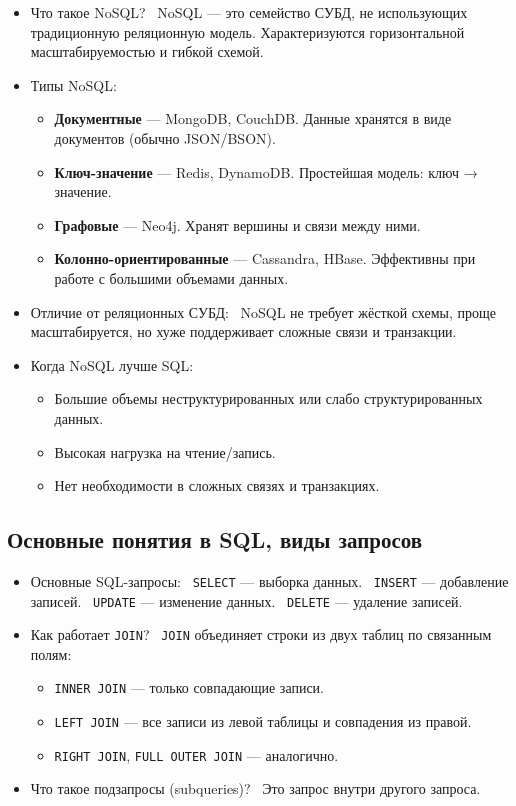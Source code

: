 \documentclass[a4paper,14pt]{article}
\begin{document}
\begin{itemize}
\item Что такое NoSQL? \
NoSQL — это семейство СУБД, не использующих традиционную реляционную модель. Характеризуются горизонтальной масштабируемостью и гибкой схемой.

\item Типы NoSQL: \
\begin{itemize}
\item \textbf{Документные} — MongoDB, CouchDB. Данные хранятся в виде документов (обычно JSON/BSON).
\item \textbf{Ключ-значение} — Redis, DynamoDB. Простейшая модель: ключ → значение.
\item \textbf{Графовые} — Neo4j. Хранят вершины и связи между ними.
\item \textbf{Колонно-ориентированные} — Cassandra, HBase. Эффективны при работе с большими объемами данных.
\end{itemize}

\item Отличие от реляционных СУБД: \
NoSQL не требует жёсткой схемы, проще масштабируется, но хуже поддерживает сложные связи и транзакции.

\item Когда NoSQL лучше SQL: \
\begin{itemize}
\item Большие объемы неструктурированных или слабо структурированных данных.
\item Высокая нагрузка на чтение/запись.
\item Нет необходимости в сложных связях и транзакциях.
\end{itemize}
\end{itemize}

\subsection{Основные понятия в SQL, виды запросов}

\begin{itemize}
\item Основные SQL-запросы: \
\texttt{SELECT} — выборка данных. \
\texttt{INSERT} — добавление записей. \
\texttt{UPDATE} — изменение данных. \
\texttt{DELETE} — удаление записей.

\item Как работает \texttt{JOIN}? \
\texttt{JOIN} объединяет строки из двух таблиц по связанным полям:
\begin{itemize}
\item \texttt{INNER JOIN} — только совпадающие записи.
\item \texttt{LEFT JOIN} — все записи из левой таблицы и совпадения из правой.
\item \texttt{RIGHT JOIN}, \texttt{FULL OUTER JOIN} — аналогично.
\end{itemize}

\item Что такое подзапросы (subqueries)? \
Это запрос внутри другого запроса.
\end{itemize}
\end{document}
